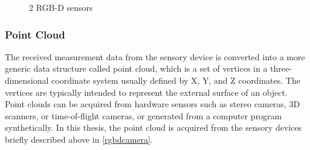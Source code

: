 \begin{figure}%
    \centering
    \qquad
    \caption{2 RGB-D sensors}%
    \label{fig:mycam}%
\end{figure}

\subsubsection{Point Cloud}

 The received measurement data from the sensory device is converted into a more generic data structure called point cloud, which is a set of vertices in a three-dimensional coordinate system usually defined by X, Y, and Z coordinates. The vertices are typically intended to represent the external surface of an object.
 Point clouds can be acquired from hardware sensors such as stereo cameras, 3D scanners, or time-of-flight cameras, or generated from a computer program synthetically. In this thesis, the point cloud is acquired from the sensory devices briefly described above in \ref{rgbdcamera}.


